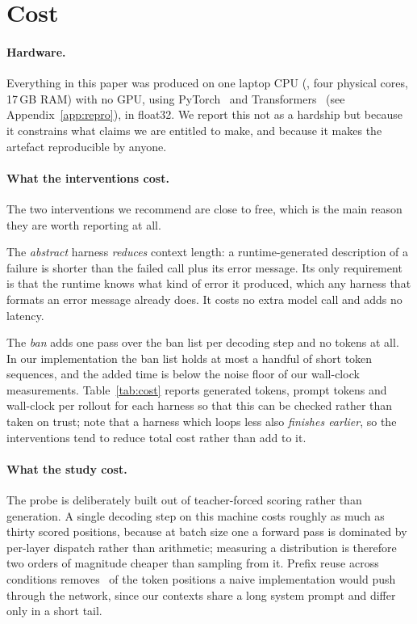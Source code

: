 \section{Cost}
\label{sec:efficiency}

\paragraph{Hardware.}
Everything in this paper was produced on one laptop CPU
(\CPUName, four physical cores, 17\,GB RAM) with no GPU, using
PyTorch \TorchVersion\ and Transformers \TransformersVersions\ (see
Appendix~\ref{app:repro}), in float32. We
report this not as a hardship but because it constrains what claims we are
entitled to make, and because it makes the artefact reproducible by anyone.

\paragraph{What the interventions cost.}
The two interventions we recommend are close to free, which is the main reason
they are worth reporting at all.

The \emph{abstract} harness \emph{reduces} context length: a runtime-generated
description of a failure is shorter than the failed call plus its error message.
Its only requirement is that the runtime knows what kind of error it produced,
which any harness that formats an error message already does. It costs no extra
model call and adds no latency.

The \emph{ban} adds one pass over the ban list per decoding step and no tokens
at all. In our implementation the ban list holds at most a handful of short
token sequences, and the added time is below the noise floor of our wall-clock
measurements. Table~\ref{tab:cost} reports generated tokens, prompt tokens and
wall-clock per rollout for each harness so that this can be checked rather than
taken on trust; note that a harness which loops less also \emph{finishes
earlier}, so the interventions tend to reduce total cost rather than add to it.



\paragraph{What the study cost.}
The probe is deliberately built out of teacher-forced scoring rather than
generation. A single decoding step on this machine costs roughly as much as
thirty scored positions, because at batch size one a forward pass is dominated
by per-layer dispatch rather than arithmetic; measuring a distribution is
therefore two orders of magnitude cheaper than sampling from it. Prefix reuse
across conditions removes \CacheSaving\ of the token positions a naive
implementation would push through the network, since our contexts share a long
system prompt and differ only in a short tail.

